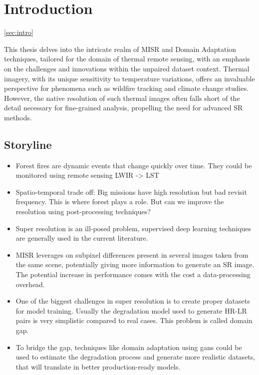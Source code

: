 \section{Introduction} \ref{sec:intro}

This thesis delves into the intricate realm of MISR and Domain Adaptation techniques, tailored for the domain of thermal remote sensing, with an emphasis on the challenges and innovations within the unpaired dataset context. Thermal imagery, with its unique sensitivity to temperature variations, offers an invaluable perspective for phenomena such as wildfire tracking and climate change studies. However, the native resolution of such thermal images often falls short of the detail necessary for fine-grained analysis, propelling the need for advanced SR methods.

    \subsection{Storyline}

    \begin{itemize}
        \item Forest fires are dynamic events that change quickly over time. They could be monitored using remote sensing LWIR -> LST
        \item Spatio-temporal trade off: Big missions have high resolution but bad revisit frequency. This is where forest plays a role. But can we improve the resolution using post-processing techniques?
        \item Super resolution is an ill-posed problem, supervised deep learning techniques are generally used in the current literature.
        \item MISR leverages on subpixel differences present in several images taken from the same scene, potentially giving more information to generate an SR image. The potential increase in performance comes with the cost a data-processing overhead.
        \item One of the biggest challenges in super resolution is to create proper datasets for model training. Usually the degradation model used to generate HR-LR pairs is very simplistic compared to real cases. This problem is called domain gap.
        
        \item To bridge the gap, techniques like domain adaptation using gans could be used to estimate the degradation process and generate more realistic datasets, that will translate in better production-ready models.
        \end{itemize}

